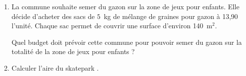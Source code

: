 \documentclass[10pt]{article}
\newcommand{\euro}{\eurologo{}}
\begin{document}
\begin{enumerate}
\item La commune souhaite semer du gazon sur la \og zone de jeux pour enfants\fg. Elle décide d'acheter des sacs de $5$~kg de mélange de graines pour gazon à 13,90~\euro{} l'unité. Chaque sac permet de couvrir une surface d'environ 140~m$^2$. 

Quel budget doit prévoir cette commune pour pouvoir semer du gazon sur la totalité de la \og zone de jeux pour enfants\fg{} ? 
\item Calculer l'aire du \og skatepark \fg. 
\end{enumerate}

\bigskip
\end{document}
